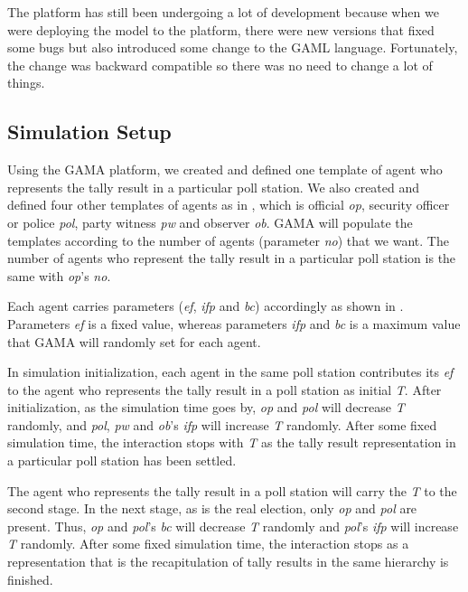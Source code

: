 \documentclass[JIP]{ipsj}
\begin{document}
The platform has still been undergoing a lot of development because when we were deploying the model to the platform, there were new versions that fixed some bugs but also introduced some change to the GAML language. Fortunately, the change was backward compatible so there was no need to change a lot of things.


\subsection{Simulation Setup}%

Using the GAMA platform, we created and defined one template of agent who represents the tally result in a particular poll station. We also created and defined four other templates of agents as in , which is official \textit{op}, security officer or police \textit{pol}, party witness \textit{pw} and observer \textit{ob}. GAMA will populate the templates according to the number of agents (parameter \textit{no}) that we want. The number of agents who represent the tally result in a particular poll station is the same with \textit{op}’s \textit{no}.

Each agent carries parameters (\textit{ef}, \textit{ifp} and \textit{bc}) accordingly as shown in . Parameters \textit{ef} is a fixed value, whereas parameters \textit{ifp} and \textit{bc} is a maximum value that GAMA will randomly set for each agent.

In simulation initialization, each agent in the same poll station contributes its \textit{ef} to the agent who represents the tally result in a poll station as initial \textit{T}. After initialization, as the simulation time goes by, \textit{op} and \textit{pol} will decrease \textit{T} randomly, and \textit{pol}, \textit{pw} and \textit{ob}’s \textit{ifp} will increase \textit{T} randomly. After some fixed simulation time, the interaction stops with \textit{T} as the tally result representation in a particular poll station has been settled.

The agent who represents the tally result in a poll station will carry the \textit{T} to the second stage. In the next stage, as is the real election, only \textit{op} and \textit{pol} are present. Thus, \textit{op} and \textit{pol}’s \textit{bc} will decrease \textit{T} randomly and \textit{pol}’s \textit{ifp} will increase \textit{T} randomly. After some fixed simulation time, the interaction stops as a representation that is the recapitulation of tally results in the same hierarchy is finished.
\end{document}
